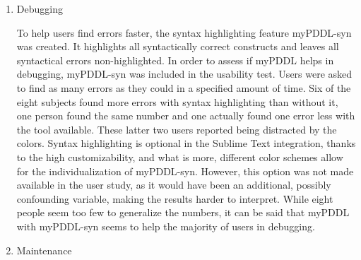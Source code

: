 \documentclass[a4paper,12pt]{report}
\newcommand{\mypddl}{\smallerft[0.8]{myPDDL}\xspace}
\newcommand{\pddl}{\textsc{pddl}\xspace}
\newcommand\smallerft[2][0.85]{{\scalefont{#1}#2}}
\begin{document}
\begin{enumerate}
Although it is assumed that most people interested in using \mypddl
have some experience in planning, unversed users should not be put off
by a complex or incomprehensible interface. To test if \mypddl is
usable even for novices, it was chosen to only allow for inexperienced
participants in the user study. However they were all required to be
familiar with at least one Lisp dialect because \pddl is Lisp-based.
As described above, participants were asked to watch a 30-minute
interactive planning and \pddl video tutorial, establishing the
basics. Before having to use the \mypddl tools, another three minute
video tutorial introduced \mypddl-syn and \mypddl-dia. None of the
users seemed to have any problems in comprehending either of these
tools after seeing the tutorial. Therefore, it can be concluded that a
small time investment for inexperienced users, and an possibly even
smaller investment for \pddl experts, results in proficient usage of
\mypddl. Nonetheless, two subjects reported having trouble with
\mypddl-syn, because they did not find it helpful or because they
found the colors hard to distinguish. It seems, though, that this
cannot be accounted to inexperience so much as to personal preference.
\item Debugging
\label{sec-5-3-0-4}

To help users find errors faster, the syntax highlighting feature
\mypddl-syn was created. It highlights all syntactically correct
constructs and leaves all syntactical errors non-highlighted. In order
to assess if \mypddl helps in debugging, \mypddl-syn was included in
the usability test. Users were asked to find as many errors as they
could in a specified amount of time. Six of the eight subjects found
more errors with syntax highlighting than without it, one person found
the same number and one actually found one error less with the tool
available. These latter two users reported being distracted by the
colors. Syntax highlighting is optional in the Sublime Text
integration, thanks to the high customizability, and what is more,
different color schemes allow for the individualization of
\mypddl-syn. However, this option was not made available in the user
study, as it would have been an additional, possibly confounding
variable, making the results harder to interpret. While eight people
seem too few to generalize the numbers, it can be said that \mypddl
with \mypddl-syn seems to help the majority of users in debugging.

\item Maintenance
\label{sec-5-3-0-5}


\end{enumerate}
\end{document}
